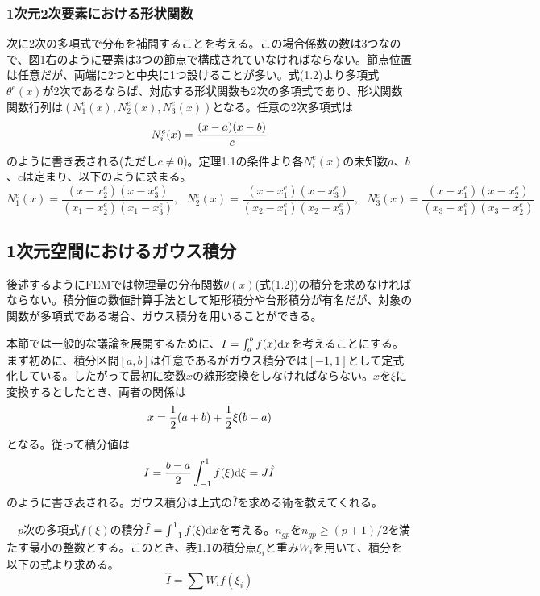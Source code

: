 \documentclass[dvipdfmx, 9pt, a4paper]{jsarticle}
\numberwithin{equation}{section}
\begin{document}
\subsubsection{1次元2次要素における形状関数}
次に2次の多項式で分布を補間することを考える。この場合係数の数は3つなので、図1右のように要素は3つの節点で構成されていなければならない。節点位置は任意だが、両端に2つと中央に1つ設けることが多い。式(1.2)より多項式$\theta^e(x)$が2次であるならば、対応する形状関数も2次の多項式であり、形状関数関数行列は$(N^e_1(x), N^e_2(x), N^e_3(x))$となる。任意の2次多項式は
\begin{equation}
N^e_i(x)=\frac{(x-a)(x-b)}{c} \notag
\end{equation}
のように書き表される(ただし$c \neq 0$)。定理1.1の条件より各$N^e_i(x)$の未知数$a$、$b$、$c$は定まり、以下のように求まる。
\begin{equation}
N^e_1(x)=\frac{(x-x_2^e)(x-x_3^e)}{(x_1-x_2^e)(x_1-x_3^e)},~~~N^e_2(x)=\frac{(x-x_1^e)(x-x_3^e)}{(x_2-x_1^e)(x_2-x_3^e)},~~~N^e_3(x)=\frac{(x-x_1^e)(x-x_2^e)}{(x_3-x_1^e)(x_3-x_2^e)}
\end{equation}

\subsection{1次元空間におけるガウス積分}
後述するようにFEMでは物理量の分布関数$\theta(x)$(式(1.2))の積分を求めなければならない。積分値の数値計算手法として矩形積分や台形積分が有名だが、対象の関数が多項式である場合、ガウス積分を用いることができる。\par
本節では一般的な議論を展開するために、$I=\int_a^b f(x) {\rm d}x$を考えることにする。まず初めに、積分区間$[a, b]$は任意であるがガウス積分では$[-1, 1]$として定式化している。したがって最初に変数$x$の線形変換をしなければならない。$x$を$\xi$に変換するとしたとき、両者の関係は
\begin{equation}
x = \frac{1}{2}(a+b) + \frac{1}{2}\xi(b-a) \notag
\end{equation}
となる。従って積分値は
\begin{equation}
I=\frac{b-a}{2}\int_{-1}^1f(\xi){\rm d}\xi=J\hat{I}
\end{equation}
のように書き表される。ガウス積分は上式の$\hat{I}$を求める術を教えてくれる。
\begin{tcolorbox}[title=1次元空間におけるガウス積分]
　$p$次の多項式$f(\xi)$の積分$\hat{I}=\int_{-1}^1f(\xi) {\rm d}x$を考える。$n_{gp}$を$n_{gp} \geq (p+1)/2$を満たす最小の整数とする。このとき、表1.1の積分点$\xi_i$と重み$W_i$を用いて、積分を以下の式より求める。
\begin{equation}
\hat{I}=\sum W_if(\xi_i)
\end{equation}
\end{tcolorbox}
\end{document}
